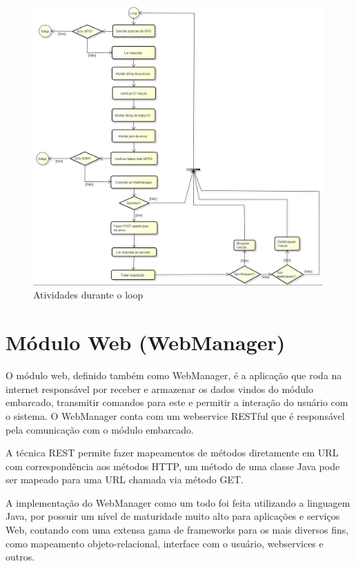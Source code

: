 \begin{figure}[!h]
	\centering
	\includegraphics[width=0.99\textwidth]{figures/ModuloVeicular_Loop.png}
	\caption{Atividades durante o loop}
	\label{fig:seqloop}
\end{figure}

\newpage

\section{Módulo Web (WebManager)}

O módulo web, definido também como WebManager, é a aplicação que roda na internet responsável por receber e armazenar os dados vindos do módulo embarcado, transmitir comandos para este e permitir a interação do usuário com o sistema. O WebManager conta com um webservice RESTful que é responsável pela comunicação com o módulo embarcado.

A técnica REST permite fazer mapeamentos de métodos diretamente em URL com correspondência aos métodos HTTP, um método de uma classe Java pode ser mapeado para uma URL chamada via método GET.

A implementação do WebManager como um todo foi feita utilizando a linguagem Java, por possuir um nível de maturidade muito alto para aplicações e serviços Web, contando com uma extensa gama de frameworks para os mais diversos fins, como mapeamento objeto-relacional, interface com o usuário,  webservices e outros.

